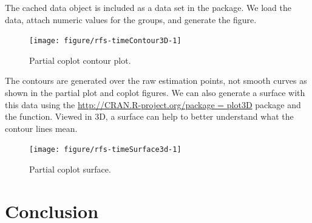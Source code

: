 \documentclass[nojss]{jss}\usepackage[]{graphicx}\usepackage[]{color}
\begin{document}
The cached  data object is included as a data set in the  package. We load the data, attach numeric values for the  groups, and generate the figure.

\begin{Schunk}
\begin{figure}[!htpb]

{\centering \texttt{[image: figure/rfs-timeContour3D-1]} 

}

\caption[Partial coplot contour plot]{Partial coplot contour plot.\label{fig:timeContour3D}}
\end{figure}
\end{Schunk}

The contours are generated over the raw  estimation points, not smooth curves as shown in the partial plot and coplot figures. We can also generate a surface with this data using the  \url{http://CRAN.R-project.org/package = plot3D} package and the  function. Viewed in 3D, a surface can help to better understand what the contour lines mean. 

\begin{Schunk}
\begin{figure}[!htpb]

{\centering \texttt{[image: figure/rfs-timeSurface3d-1]} 

}

\caption[Partial coplot surface]{Partial coplot surface.\label{fig:timeSurface3d}}
\end{figure}
\end{Schunk}

\section{Conclusion}

\appendix


\end{document}
